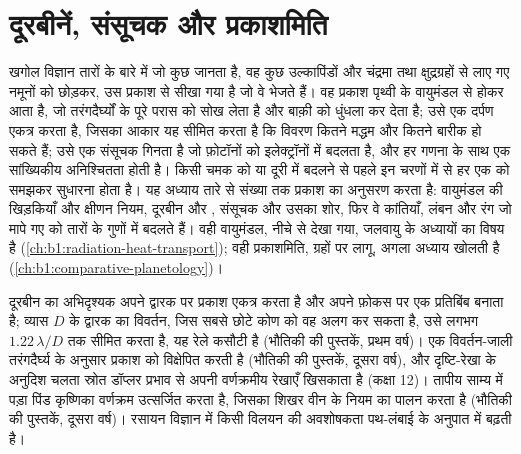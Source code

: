 \chapter{दूरबीनें, संसूचक और प्रकाशमिति}\label{ch:b1:observing-the-sky}

खगोल विज्ञान तारों के बारे में जो कुछ जानता है, वह कुछ उल्कापिंडों और चंद्रमा तथा क्षुद्रग्रहों से
लाए गए नमूनों को छोड़कर, उस प्रकाश से सीखा गया है जो वे भेजते हैं। वह प्रकाश पृथ्वी के
वायुमंडल से होकर आता है, जो तरंगदैर्घ्यों के पूरे परास को सोख लेता है और बाक़ी को धुंधला कर
देता है; उसे एक दर्पण एकत्र करता है, जिसका आकार यह सीमित करता है कि विवरण कितने मद्धम और
कितने बारीक हो सकते हैं; उसे एक संसूचक गिनता है जो फ़ोटॉनों को इलेक्ट्रॉनों में बदलता है, और
हर गणना के साथ एक सांख्यिकीय अनिश्चितता होती है। किसी चमक को  या दूरी में बदलने से पहले
इन चरणों में से हर एक को समझकर सुधारना होता है। यह अध्याय तारे से संख्या तक प्रकाश का अनुसरण
करता है: वायुमंडल की खिड़कियाँ और क्षीणन नियम, दूरबीन और , संसूचक और उसका शोर, फिर वे
कांतियाँ, लंबन और रंग जो मापे गए  को तारों के गुणों में बदलते हैं। वही वायुमंडल, नीचे से
देखा गया, जलवायु के अध्यायों का विषय है (\cref{ch:b1:radiation-heat-transport}); वही प्रकाशमिति,
ग्रहों पर लागू, अगला अध्याय खोलती है (\cref{ch:b1:comparative-planetology})।

\begin{recall}
दूरबीन का अभिदृश्यक अपने द्वारक पर प्रकाश एकत्र करता है और अपने फ़ोकस पर एक प्रतिबिंब बनाता
है; व्यास $D$ के द्वारक का विवर्तन, जिस सबसे छोटे कोण को वह अलग कर सकता है, उसे लगभग
$1.22\,\lambda/D$ तक सीमित करता है, यह रेले कसौटी है (भौतिकी की पुस्तकें, प्रथम वर्ष)। एक
विवर्तन-जाली तरंगदैर्घ्य के अनुसार प्रकाश को विक्षेपित करती है (भौतिकी की पुस्तकें, दूसरा
वर्ष), और दृष्टि-रेखा के अनुदिश चलता स्रोत डॉप्लर प्रभाव से अपनी वर्णक्रमीय रेखाएँ खिसकाता है
(कक्षा 12)। तापीय साम्य में पड़ा पिंड कृष्णिका वर्णक्रम उत्सर्जित करता है, जिसका शिखर वीन के
नियम का पालन करता है (भौतिकी की पुस्तकें, दूसरा वर्ष)। रसायन विज्ञान में किसी विलयन की
अवशोषकता पथ-लंबाई के अनुपात में बढ़ती है।
\end{recall}

